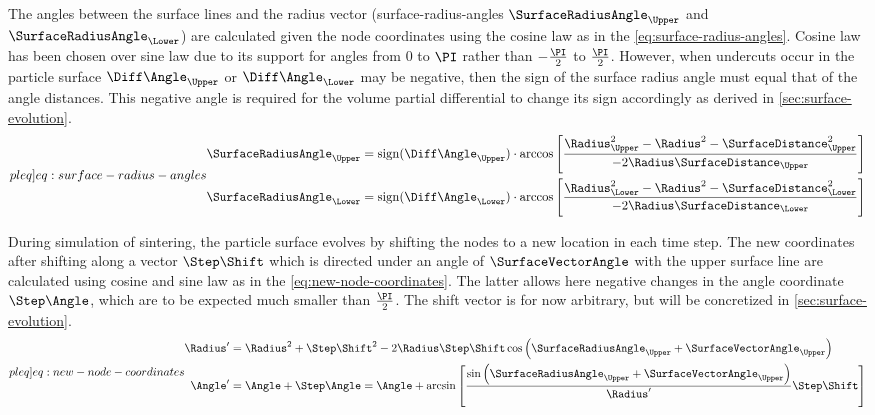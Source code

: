 The angles between the surface lines and the radius vector (surface-radius-angles $\SurfaceRadiusAngle_{\Upper}$ and $\SurfaceRadiusAngle_{\Lower}$) are calculated given the node coordinates using the cosine law as in the \cref{eq:surface-radius-angles}.
Cosine law has been chosen over sine law due to its support for angles from 0 to $\PI$ rather than $-\frac\PI2$ to $\frac\PI2$.
However, when undercuts occur in the particle surface $\Diff\Angle_{\Upper}$ or $\Diff\Angle_{\Lower}$ may be negative, then the sign of the surface radius angle must equal that of the angle distances.
This negative angle is required for the volume partial differential to change its sign accordingly as derived in \cref{sec:surface-evolution}.
\begin{subequations}
    \label[pleq]{eq:surface-radius-angles}
    \begin{align}
        \SurfaceRadiusAngle_{\Upper} &= \sign(\Diff\Angle_{\Upper}) \cdot \arccos \left[ \frac{\Radius_{\Upper}^2 - \Radius^2 - \SurfaceDistance_{\Upper} ^ 2}{-2 \Radius \SurfaceDistance_{\Upper}} \right] \\
        \SurfaceRadiusAngle_{\Lower} &= \sign(\Diff\Angle_{\Lower}) \cdot \arccos \left[ \frac{\Radius_{\Lower}^2 - \Radius^2 - \SurfaceDistance_{\Lower} ^ 2}{-2 \Radius \SurfaceDistance_{\Lower}} \right]
    \end{align}
\end{subequations}

During simulation of sintering, the particle surface evolves by shifting the nodes to a new location in each time step.
The new coordinates after shifting along a vector $\Step\Shift$ which is directed under an angle of $\SurfaceVectorAngle$ with the upper surface line are calculated using cosine and sine law as in the \cref{eq:new-node-coordinates}.
The latter allows here negative changes in the angle coordinate $\Step\Angle$, which are to be expected much smaller than $\frac\PI2$.
The shift vector is for now arbitrary, but will be concretized in \cref{sec:surface-evolution}.
\begin{subequations}
    \label[pleq]{eq:new-node-coordinates}
    \begin{align}
        \Radius' &= \Radius^2 + {\Step\Shift}^2 - 2 \Radius\Step\Shift \cos \left( \SurfaceRadiusAngle_{\Upper} + \SurfaceVectorAngle_{\Upper} \right) \\
        \Angle' &= \Angle + \Step\Angle = \Angle + \arcsin \left[ \frac{\sin \left( \SurfaceRadiusAngle_{\Upper} + \SurfaceVectorAngle_{\Upper} \right) }{\Radius'} \Step\Shift \right]
    \end{align}
\end{subequations}

